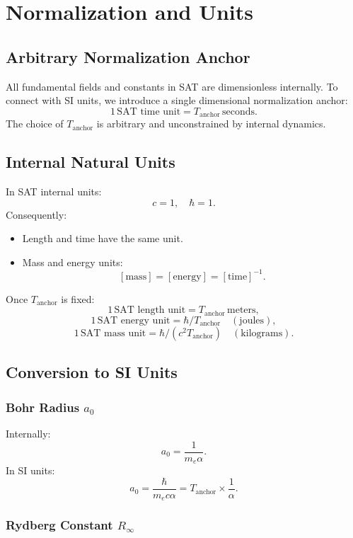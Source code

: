 \documentclass[12pt]{article}
\begin{document}
\newpage
\section{Normalization and Units}

\subsection{Arbitrary Normalization Anchor}

All fundamental fields and constants in SAT are dimensionless internally. To connect with SI units, we introduce a single dimensional normalization anchor:
\[
1 \, \text{SAT time unit} = T_{\text{anchor}} \, \text{seconds}.
\]
The choice of \( T_{\text{anchor}} \) is arbitrary and unconstrained by internal dynamics.

\subsection{Internal Natural Units}

In SAT internal units:
\[
c = 1, \quad \hbar = 1.
\]
Consequently:
\begin{itemize}
    \item Length and time have the same unit.
    \item Mass and energy units:
    \[
    [\text{mass}] = [\text{energy}] = [\text{time}]^{-1}.
    \]
\end{itemize}

Once \( T_{\text{anchor}} \) is fixed:
\[
1 \, \text{SAT length unit} = T_{\text{anchor}} \, \text{meters},
\]
\[
1 \, \text{SAT energy unit} = \hbar / T_{\text{anchor}} \quad (\text{joules}),
\]
\[
1 \, \text{SAT mass unit} = \hbar / (c^2 T_{\text{anchor}}) \quad (\text{kilograms}).
\]

\subsection{Conversion to SI Units}

\subsubsection{Bohr Radius \( a_0 \)}

Internally:
\[
a_0 = \frac{1}{m_e \alpha}.
\]
In SI units:
\[
a_0 = \frac{\hbar}{m_e c \alpha} = T_{\text{anchor}} \times \frac{1}{\alpha}.
\]

\subsubsection{Rydberg Constant \( R_\infty \)}
\end{document}
